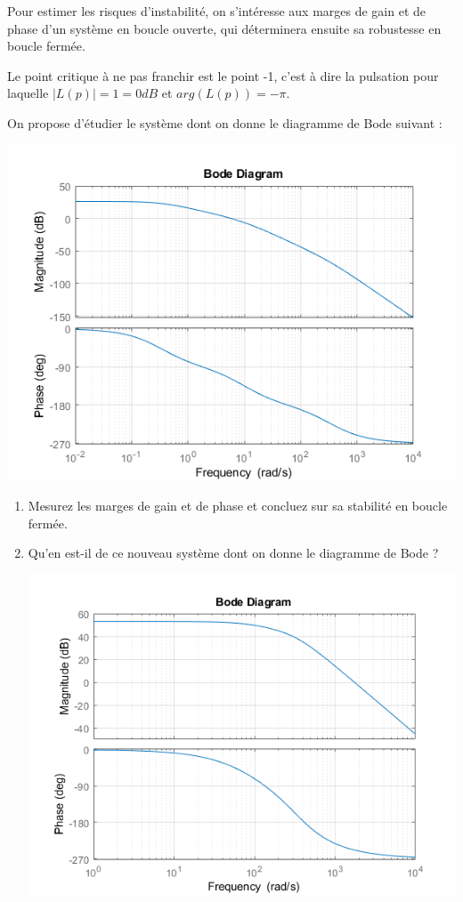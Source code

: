 Pour estimer les risques d'instabilité, on s'intéresse aux marges de gain et de phase d'un système en boucle ouverte, qui déterminera ensuite sa robustesse en boucle fermée.

Le point critique à ne pas franchir est le point -1, c'est à dire la pulsation pour laquelle $\lvert L(p) \rvert = 1 = 0dB$ et $arg(L(p)) = -\pi$.

On propose d'étudier le système dont on donne le diagramme de Bode suivant :

\begin{center}
	\includegraphics[width=15cm]{images/TD/sys_stable2.png}
\end{center}

\begin{enumerate}
	\item Mesurez les marges de gain et de phase et concluez sur sa stabilité en boucle fermée.
	\item Qu'en est-il de ce nouveau système dont on donne le diagramme de Bode ?

\begin{center}
	\includegraphics[width=15cm]{images/TD/sys_instable2.png}
\end{center}

\end{enumerate}

